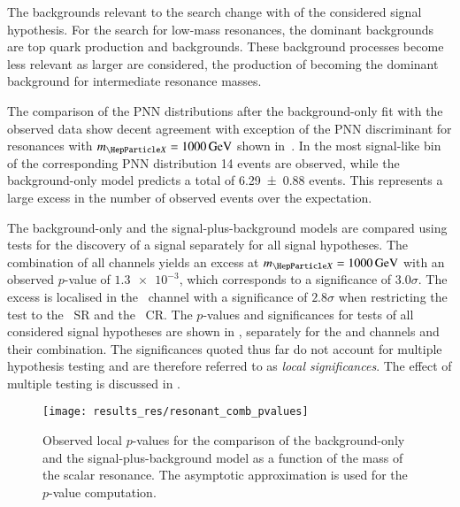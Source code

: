 The backgrounds relevant to the search change with \mX of the considered signal
hypothesis. For the search for low-mass resonances, the dominant backgrounds are
top quark production and \faketauhadvis backgrounds. These background processes
become less relevant as larger \mX are considered, the production of \Zjets
becoming the dominant background for intermediate resonance masses.

The comparison of the PNN distributions after the background-only fit with the
observed data show decent agreement with exception of the PNN discriminant for
resonances with $\mX = \SI{1000}{\GeV}$ shown in~. In
the most signal-like bin of the corresponding PNN distribution 14 events are
observed, while the background-only model predicts a total of \num{6.29 +- 0.88}
events. This represents a large excess in the number of observed events over the
expectation.

%
The background-only and the signal-plus-background models are compared using
tests for the discovery of a signal separately for all signal hypotheses. The
combination of all channels yields an excess at $\mX = \SI{1000}{\GeV}$ with an
observed $p$-value of $\num{1.3e-3}$, which corresponds to a significance of
$\num{3.0}\sigma$.
The excess is localised in the \hadhad~channel with a significance of
$\num{2.8}\sigma$ when restricting the test to the \hadhad~SR and the
\ZHF~CR. The $p$-values and significances for tests of all considered signal
hypotheses are shown in , separately for the \lephad and
\hadhad channels and their combination. The significances quoted thus far do not
account for multiple hypothesis testing and are therefore referred to as
\emph{local significances}. The effect of multiple testing is discussed in
.

\begin{figure}[htbp]
  \centering

  \texttt{[image: results\_res/resonant\_comb\_pvalues]}

  \caption{Observed local $p$-values for the comparison of the background-only
    and the signal-plus-background model as a function of the mass of the scalar
    resonance. The asymptotic approximation is used for the $p$-value
    computation.}%
  \label{fig:local_pvalues}

\end{figure}

